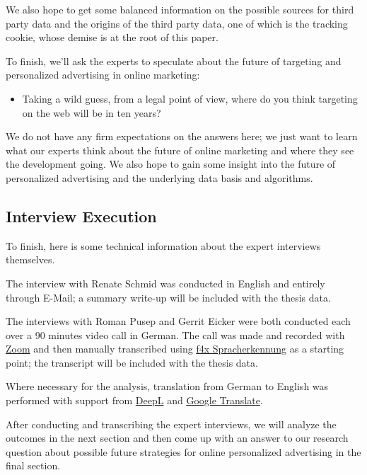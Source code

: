 We also hope to get some balanced information on the possible sources for third party data and the origins of the third party data, one of which is the tracking cookie, whose demise is at the root of this paper.

To finish, we'll ask the experts to speculate about the future of targeting and personalized advertising in online marketing:
 
\begin{itemize} 
 \item Taking a wild guess, from a legal point of view, where do you think targeting on the web will be in ten years?
\end{itemize}

We do not have any firm expectations on the answers here; we just want to learn what our experts think about the future of online marketing and where they see the development going. We also hope to gain some insight into the future of personalized advertising and the underlying data basis and algorithms.

\subsection{Interview Execution}

To finish, here is some technical information about the expert interviews themselves.

The interview with Renate Schmid was conducted in English and entirely through E-Mail; a summary write-up will be included with the thesis data.

The interviews with Roman Pusep and Gerrit Eicker were both conducted each over a 90 minutes video call in German. The call was made and recorded with \href{https://zoom.us/}{Zoom} and then manually transcribed using \href{https://f4x.audiotranskription.de/}{f4x Spracherkennung} as a starting point; the transcript will be included with the thesis data.

Where necessary for the analysis, translation from German to English was performed with support from \href{https://www.deepl.com/en/translator}{DeepL} and \href{https://translate.google.de/}{Google Translate}.

After conducting and transcribing the expert interviews, we will analyze the outcomes in the next section and then come up with an answer to our research question about possible future strategies for online personalized advertising in the final section.

